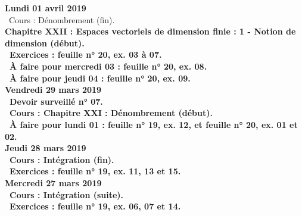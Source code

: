 \documentclass[12pt,a4paper]{article}
\begin{document}
% 
% 


\noindent\textbf{Lundi 01 avril 2019}\\
\bu\ Cours : Dénombrement (fin).\\
\bf Chapitre XXII \rm : Espaces vectoriels de dimension finie  : 1 - Notion de dimension (début).\\
\bu\ Exercices : feuille n° 20, ex. 03 à 07.\\
\bu\ À faire pour mercredi 03 : feuille n° 20, ex. 08.\\
\bu\ À faire pour jeudi 04 : feuille n° 20, ex. 09.\vspace{.4cm}\\

\noindent\textbf{\bf Vendredi 29 mars 2019} \\
\bu\ Devoir surveillé n° 07.\\
\bu\ Cours : \bf Chapitre XXI \rm : Dénombrement (début).\\
\bu\ À faire pour lundi 01 : feuille n° 19, ex. 12, et feuille n° 20, ex. 01 et 02.\vspace{.4cm}\\

\noindent\textbf{Jeudi 28 mars 2019}\\
\bu\ Cours : Intégration (fin).\\
\bu\ Exercices : feuille n° 19, ex. 11, 13 et 15.\vspace{.4cm}\\

\noindent\textbf{Mercredi 27 mars 2019} \\
\bu\ Cours : Intégration (suite).\\
\bu\ Exercices : feuille n° 19, ex. 06, 07 et 14.\vspace{.4cm}\\
\end{document}
